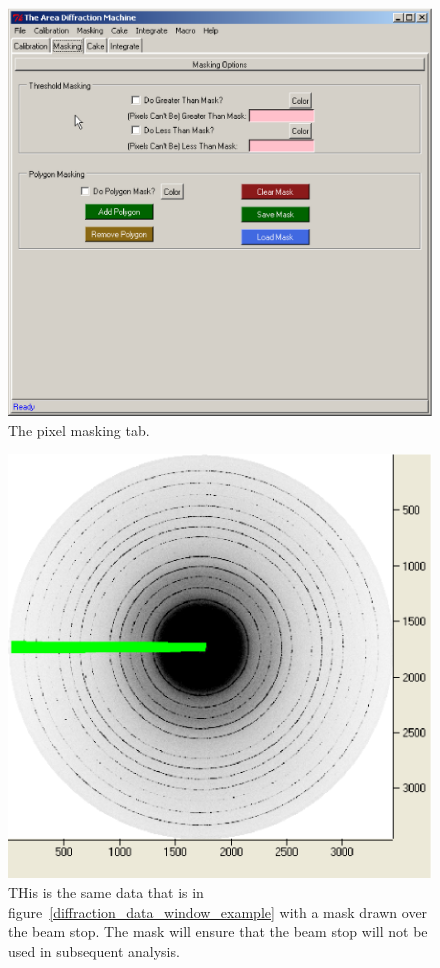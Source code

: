 \begin{figure}
    \centering
    \includegraphics[scale=.75]
    {figures/masking_tab.eps}
    \caption{The pixel masking tab.}
    \label{masking_tab_example}
\end{figure}

\begin{figure}
    \centering
    \includegraphics[scale=.75]
    {figures/masked_beam_stop.eps}
    \caption{THis is the same data that is in
    figure~\ref{diffraction_data_window_example} with a
    mask drawn over the beam stop. The mask will ensure
    that the beam stop will not be used in subsequent analysis.}
    \label{masked_beam_stop}
\end{figure}

